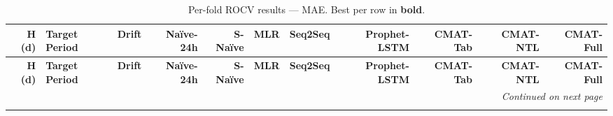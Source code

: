 \begingroup\small\setlength{\tabcolsep}{2pt}\renewcommand{\arraystretch}{1.2}
\begin{longtable}{r l r r r r r r r r r}
\caption{Per-fold ROCV results --- MAE. Best per row in \textbf{bold}.}
\label{tab:baseline_mae} \\

\toprule
\textbf{H (d)} & \textbf{Target Period} & \textbf{Drift} & \textbf{Na\"ive-24h} & \textbf{S-Na\"ive} & \textbf{MLR} & \textbf{Seq2Seq} & \textbf{Prophet-LSTM} & \textbf{CMAT-Tab} & \textbf{CMAT-NTL} & \textbf{CMAT-Full} \\
\midrule
\endfirsthead

\toprule
\textbf{H (d)} & \textbf{Target Period} & \textbf{Drift} & \textbf{Na\"ive-24h} & \textbf{S-Na\"ive} & \textbf{MLR} & \textbf{Seq2Seq} & \textbf{Prophet-LSTM} & \textbf{CMAT-Tab} & \textbf{CMAT-NTL} & \textbf{CMAT-Full} \\
\midrule
\endhead

\midrule
\multicolumn{11}{r}{\textit{Continued on next page}} \\
\endfoot

\bottomrule
\endlastfoot


\end{longtable}
